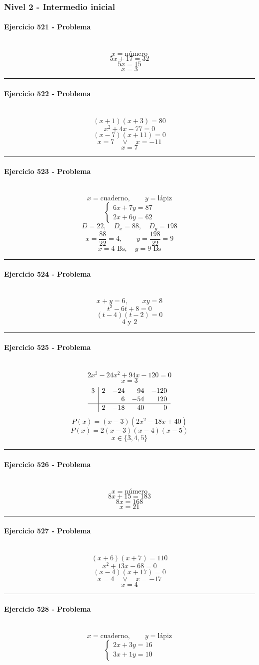 \documentclass[10pt,a4paper]{article}
\newcommand{\res}[1]{\paragraph{#1}\mbox{}\\[-1.2em]}
\begin{document}
\subsubsection*{Nivel 2 - Intermedio inicial}
\res{Ejercicio 521 - Problema}
\[ x=\text{número} \]
\[ 5x+17=32 \]
\[ 5x=15 \]
\[ \boxed{x=3} \]
\vspace{1mm}\hrule\vspace{2mm}
\res{Ejercicio 522 - Problema}
\[ (x+1)(x+3)=80 \]
\[ x^{2} + 4 x - 77=0 \]
\[ (x-7)(x+11)=0 \]
\[ x=7\quad \vee \quad x=-11 \]
\[ \boxed{x=7} \]
\vspace{1mm}\hrule\vspace{2mm}
\res{Ejercicio 523 - Problema}
\[ x=\text{cuaderno},\qquad y=\text{lápiz} \]
\[ \begin{cases}6x+7y=87\\2x+6y=62\end{cases} \]
\[ D=22,\quad D_x=88,\quad D_y=198 \]
\[ x=\frac{88}{22}=4,\qquad y=\frac{198}{22}=9 \]
\[ \boxed{x=4\text{ Bs},\quad y=9\text{ Bs}} \]
\vspace{1mm}\hrule\vspace{2mm}
\res{Ejercicio 524 - Problema}
\[ x+y=6,\qquad xy=8 \]
\[ t^2-6t+8=0 \]
\[ (t-4)(t-2)=0 \]
\[ \boxed{4\text{ y }2} \]
\vspace{1mm}\hrule\vspace{2mm}
\res{Ejercicio 525 - Problema}
\[ 2 x^{3} - 24 x^{2} + 94 x - 120=0 \]
\[ x=3 \]
\[\begin{array}{r|rrrr}3 & 2 & -24 & 94 & -120\\  &  & 6 & -54 & 120\\\hline  & 2 & -18 & 40 & 0\end{array}\]
\[ P(x)=(x-3)(2 x^{2} - 18 x + 40) \]
\[ P(x)=2(x-3)(x-4)(x-5) \]
\[ \boxed{x\in\{3,4,5\}} \]
\vspace{1mm}\hrule\vspace{2mm}
\res{Ejercicio 526 - Problema}
\[ x=\text{número} \]
\[ 8x+15=183 \]
\[ 8x=168 \]
\[ \boxed{x=21} \]
\vspace{1mm}\hrule\vspace{2mm}
\res{Ejercicio 527 - Problema}
\[ (x+6)(x+7)=110 \]
\[ x^{2} + 13 x - 68=0 \]
\[ (x-4)(x+17)=0 \]
\[ x=4\quad \vee \quad x=-17 \]
\[ \boxed{x=4} \]
\vspace{1mm}\hrule\vspace{2mm}
\res{Ejercicio 528 - Problema}
\[ x=\text{cuaderno},\qquad y=\text{lápiz} \]
\[ \begin{cases}2x+3y=16\\3x+1y=10\end{cases} \]
\end{document}
